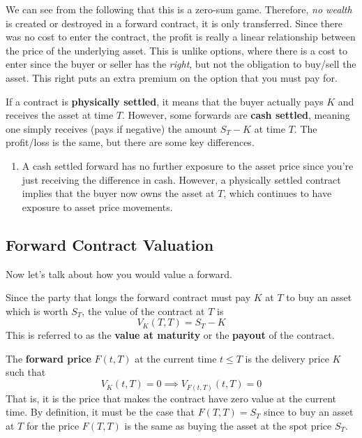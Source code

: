 \documentclass{article}
\begin{document}
    We can see from the following that this is a zero-sum game. Therefore, \textit{no wealth} is created or destroyed in a forward contract, it is only transferred. Since there was no cost to enter the contract, the profit is really a linear relationship between the price of the underlying asset. This is unlike options, where there is a cost to enter since the buyer or seller has the \textit{right}, but not the obligation to buy/sell the asset. This right puts an extra premium on the option that you must pay for. 

    \begin{definition}[Settlement]
      If a contract is \textbf{physically settled}, it means that the buyer actually pays $K$ and receives the asset at time $T$. However, some forwards are \textbf{cash settled}, meaning one simply receives (pays if negative) the amount $S_T - K$ at time $T$. The profit/loss is the same, but there are some key differences. 
      \begin{enumerate}
        \item A cash settled forward has no further exposure to the asset price since you're just receiving the difference in cash. However, a physically settled contract implies that the buyer now owns the asset at $T$, which continues to have exposure to asset price movements. 
      \end{enumerate}
    \end{definition}

  \subsection{Forward Contract Valuation}

    Now let's talk about how you would value a forward. 

    \begin{definition}
      Since the party that longs the forward contract must pay $K$ at $T$ to buy an asset which is worth $S_T$, the value of the contract at $T$ is 
      \begin{equation}
        V_K (T, T) = S_T - K
      \end{equation}
      This is referred to as the \textbf{value at maturity} or the \textbf{payout} of the contract.
    \end{definition}

    \begin{definition}
      The \textbf{forward price} $F(t, T)$ at the current time $t \leq T$ is the delivery price $K$ such that 
      \begin{equation}
        V_K (t, T) = 0 \implies V_{F(t, T)} (t, T) = 0 
      \end{equation}
      That is, it is the price that makes the contract have zero value at the current time. By definition, it must be the case that $F(T, T) = S_T$ since to buy an asset at $T$ for the price $F(T, T)$ is the same as buying the asset at the spot price $S_T$. 
    \end{definition}
\end{document}
